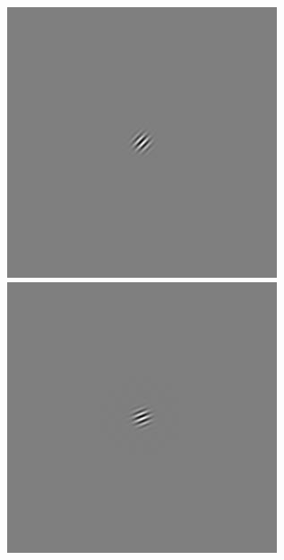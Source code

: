 \begin{figure}[ht]
\begin{center}
 \includegraphics[width=\columnwidth/9]{ch4/figures/rGabor0_2.jpg}
 \includegraphics[width=\columnwidth/9]{ch4/figures/rGabor0_3.jpg}

\end{center}
\end{figure}
